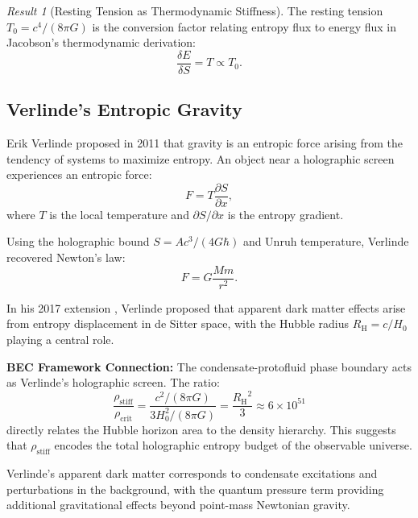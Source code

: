 \documentclass[11pt,a4paper]{article}
\newcommand{\rhocrit}{\ensuremath{\rho_{\mathrm{crit}}}}
\newcommand{\rhostiff}{\ensuremath{\rho_{\mathrm{stiff}}}}
\newcommand{\Tzero}{\ensuremath{T_0}}
\newcommand{\RH}{\ensuremath{R_{\mathrm{H}}}}
\theoremstyle{definition}
\theoremstyle{remark}
\newtheorem{result}[theorem]{Result}
\begin{document}
\begin{result}[Resting Tension as Thermodynamic Stiffness]
The resting tension $\Tzero = c^4/(8\pi G)$ is the conversion factor relating entropy flux to energy flux in Jacobson's thermodynamic derivation:
\begin{equation}
\boxed{\frac{\delta E}{\delta S} = T \propto \Tzero.}
\end{equation}
\end{result}

\subsection{Verlinde's Entropic Gravity}
\label{sec:verlinde}

Erik Verlinde proposed in 2011 \cite{Verlinde2011} that gravity is an entropic force arising from the tendency of systems to maximize entropy. An object near a holographic screen experiences an entropic force:
\begin{equation}
\label{eq:verlinde_force}
F = T \frac{\partial S}{\partial x},
\end{equation}
where $T$ is the local temperature and $\partial S/\partial x$ is the entropy gradient.

Using the holographic bound $S = A c^3/(4G\hbar)$ and Unruh temperature, Verlinde recovered Newton's law:
\begin{equation}
F = G \frac{M m}{r^2}.
\end{equation}

In his 2017 extension \cite{Verlinde2017}, Verlinde proposed that apparent dark matter effects arise from entropy displacement in de Sitter space, with the Hubble radius $\RH = c/H_0$ playing a central role.

\textbf{BEC Framework Connection:} The condensate-protofluid phase boundary acts as Verlinde's holographic screen. The ratio:
\begin{equation}
\label{eq:verlinde_ratio}
\frac{\rhostiff}{\rhocrit} = \frac{c^2/(8\pi G)}{3H_0^2/(8\pi G)} = \frac{\RH^2}{3} \approx 6 \times 10^{51}
\end{equation}
directly relates the Hubble horizon area to the density hierarchy. This suggests that $\rhostiff$ encodes the total holographic entropy budget of the observable universe.

Verlinde's apparent dark matter corresponds to condensate excitations and perturbations in the background, with the quantum pressure term providing additional gravitational effects beyond point-mass Newtonian gravity.
\end{document}
